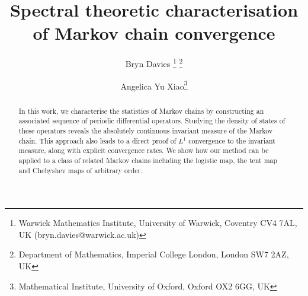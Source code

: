 \documentclass[a4paper]{article}
\title{Spectral theoretic characterisation of Markov chain convergence}
\author{Bryn Davies \thanks{Warwick Mathematics Institute, University of Warwick, Coventry CV4 7AL, UK (bryn.davies@warwick.ac.uk) } \thanks{\footnotesize Department of Mathematics, Imperial College London, London SW7 2AZ, UK} \and Angelica Yu Xiao\footnotemark[2] \thanks{Mathematical Institute, University of Oxford, Oxford OX2 6GG, UK} }
\date{}
\theoremstyle{definition}
\numberwithin{equation}{section}
\numberwithin{theorem}{section}
\begin{document}
	\maketitle

	\begin{abstract}
	In this work, we characterise the statistics of Markov chains by constructing an associated sequence of periodic differential operators. Studying the density of states of these operators reveals the absolutely continuous invariant measure of the Markov chain. This approach also leads to a direct proof of $L^1$ convergence to the invariant measure, along with explicit convergence rates. We show how our method can be applied to a class of related Markov chains including the logistic map, the tent map and Chebyshev maps of arbitrary order.
	\end{abstract}
\vspace{0.5cm}
\end{document}
